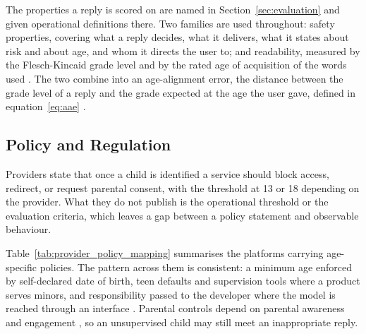 The properties a reply is scored on are named in Section~\ref{sec:evaluation} and
given operational definitions there. Two families are used throughout: safety
properties, covering what a reply decides, what it delivers, what it states about
risk and about age, and whom it directs the user to; and readability, measured by
the Flesch-Kincaid grade level and by the rated age of acquisition of the words
used \cite{kupermanAgeofacquisitionRatings300002012}. The two combine into an
age-alignment error, the distance between the grade level of a reply and the
grade expected at the age the user gave, defined in equation~\eqref{eq:aae}
\cite{ozcanEvaluatingChildAppropriateLanguage2026}.

\subsection{Policy and Regulation}
\label{sec:policy}
\label{sec:provider_policies}
\label{subsec:product-layer}
\label{sec:regulation}
\label{sec:expectations}

Providers state that once a child is identified a service should block access,
redirect, or request parental consent, with the threshold at 13 or 18 depending
on the provider. What they do not publish is the operational threshold or the
evaluation criteria, which leaves a gap between a policy statement and
observable behaviour.

Table~\ref{tab:provider_policy_mapping} summarises the platforms carrying
age-specific policies. The pattern across them is consistent: a minimum age
enforced by self-declared date of birth, teen defaults and supervision tools
where a product serves minors, and responsibility passed to the developer where
the model is reached through an interface
\cite{PrivacyPolicy, BuildingAgePrediction2026, OurApproachAge2025,
IntroducingParentalControls2025, IntroducingTeenSafety2026, AgePredictionChatGPT,
TeenSafetyFreedom2026, HelpingDevelopersBuild2026, ResponsibleUseAnthropics2026,
TermsServiceConsumersa, AnthropicsTransparencyHub, MicrosoftCopilotAge,
ListCountriesRegions, UsagePolicyMistral, DeepSeekTermsUse, QwenPrivacyPolicy,
isolomonsIntroducingInstagramTeen2024, isolomonsOurApproachTeen2025,
ExpandingTeenAccount2025, joedamianiNewAIPoweredAge2026,
joedamianiNewSupervisionTools2026, heatheraHelpingParentsUnderstand2026,
heatheraNewAlertsLet2026, heatheraWorkingParentsEnroll2025,
BuildInternetYoung2025, PolicyFrameworkProtect2023, GuidingAIGeneration2026,
6TakeawaysOur2026, NewExpandedAndroid2026}. Parental controls depend on parental
awareness and engagement \cite{4WaysParents2024, HelpingKidsTeens2026}, so an
unsupervised child may still meet an inappropriate reply.

